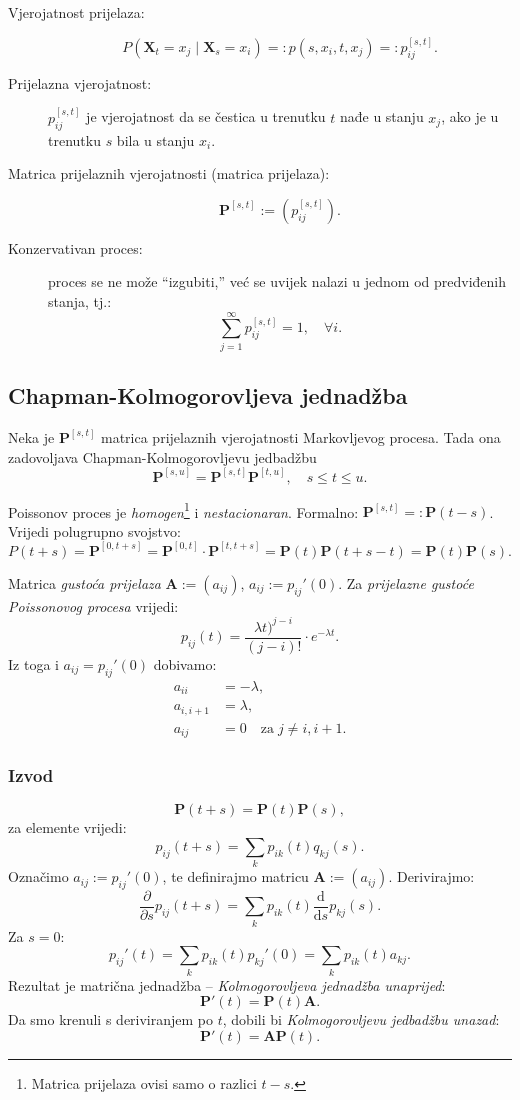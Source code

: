 \documentclass[12pt,english]{article}
\newcommand{\X}{\mathbf X}
\newcommand{\A}{\mathbf A}
\newcommand{\MP}{\mathbf P}
\newcommand{\vertS}{\; \vert \;}
\begin{document}
\begin{description}
  \item[Vjerojatnost prijelaza:]
  $$P(\X_t=x_j \vertS \X_s = x_i)=: p(s,x_i,t,x_j) =: p_{ij}^{[s,t]}.$$
  \item[Prijelazna vjerojatnost:] $p_{ij}^{[s,t]}$ je vjerojatnost da se čestica u trenutku $t$ nađe u stanju $x_j$, ako je u trenutku $s$ bila u stanju $x_i$.
  \item[Matrica prijelaznih vjerojatnosti (matrica prijelaza):]
  $$\MP^{[s,t]} := \left(p_{ij}^{[s,t]}\right).$$
  \item[Konzervativan proces:] proces se ne može ``izgubiti,'' već se uvijek nalazi u jednom od predviđenih stanja, tj.:
  $$\sum\limits_{j=1}^\infty p_{ij}^{[s,t]} = 1, \quad \forall i.$$
\end{description}

\subsection{Chapman-Kolmogorovljeva jednadžba}
Neka je $\MP^{[s,t]}$ matrica prijelaznih vjerojatnosti Markovljevog procesa. Tada ona zadovoljava Chapman-Kolmogorovljevu jedbadžbu
$$\MP^{[s,u]} = \MP^{[s,t]}\MP^{[t,u]},\quad s \leq t \leq u.$$

\noindent Poissonov proces je \emph{homogen}\footnote{Matrica prijelaza ovisi samo o razlici $t-s$.} i \emph{nestacionaran}. Formalno: $\MP^{[s,t]} =: \MP(t-s)$. Vrijedi polugrupno svojstvo:
$$P(t+s) = \MP^{[0,t+s]}=\MP^{[0,t]}\cdot \MP^{[t,t+s]}=\MP(t)\MP(t+s-t)=\MP(t)\MP(s).$$

\noindent Matrica \emph{gustoća prijelaza} $\A := (a_{ij})$, $a_{ij}:=p_{ij}'(0)$. Za \emph{prijelazne gustoće Poissonovog procesa} vrijedi:
$$p_{ij}(t)=\frac{\lambda t)^{j-i}}{(j-i)!}\cdot e^{-\lambda t}.$$
Iz toga i $a_{ij} = p_{ij}'(0)$ dobivamo:
\begin{align}
a_{ii} &= -\lambda, \nonumber \\
a_{i,i+1} &= \lambda, \nonumber \\
a_{ij} &= 0\quad \text{za}\; j\neq i, i+1. \nonumber
\end{align}


\subsubsection{Izvod}
$$\MP(t+s)=\MP(t)\MP(s),$$
za elemente vrijedi:
$$p_{ij}(t+s) = \sum\limits_k p_{ik}(t)q_{kj}(s).$$
Označimo $a_{ij}:=p_{ij}'(0)$, te definirajmo matricu $\A := (a_{ij})$. Derivirajmo:
$$\frac{\partial}{\partial s}p_{ij}(t+s) = \sum\limits_k p_{ik}(t)\frac{\mathrm d}{\mathrm ds}p_{kj}(s).$$
Za $s=0$:
$$p_{ij}'(t)=\sum\limits_k p_{ik}(t)p_{kj}'(0)=\sum\limits_k p_{ik}(t)a_{kj}.$$
Rezultat je matrična jednadžba -- \emph{Kolmogorovljeva jednadžba unaprijed}:
$$\MP'(t)=\MP(t)\A.$$
Da smo krenuli s deriviranjem po $t$, dobili bi \emph{Kolmogorovljevu jedbadžbu unazad}:
$$\MP'(t)=\A\MP(t).$$
\end{document}
